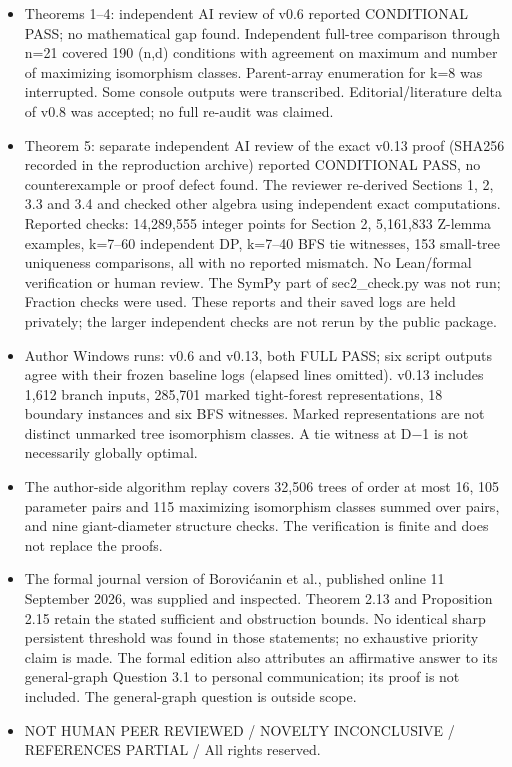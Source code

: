 \documentclass[
  10pt,
  a4paper,
]{article}
\providecommand{\tightlist}{%
  \setlength{\itemsep}{0pt}\setlength{\parskip}{0pt}}
\begin{document}
\begin{itemize}
\tightlist
\item
  Theorems 1--4: independent AI review of v0.6 reported CONDITIONAL
  PASS; no mathematical gap found. Independent full-tree comparison
  through n=21 covered 190 (n,d) conditions with agreement on maximum
  and number of maximizing isomorphism classes. Parent-array enumeration
  for k=8 was interrupted. Some console outputs were transcribed.
  Editorial/literature delta of v0.8 was accepted; no full re-audit was
  claimed.
\item
  Theorem 5: separate independent AI review of the exact v0.13 proof
  (SHA256 recorded in the reproduction archive) reported CONDITIONAL
  PASS, no counterexample or proof defect found. The reviewer re-derived
  Sections 1, 2, 3.3 and 3.4 and checked other algebra using independent
  exact computations. Reported checks: 14,289,555 integer points for
  Section 2, 5,161,833 Z-lemma examples, k=7--60 independent DP, k=7--40
  BFS tie witnesses, 153 small-tree uniqueness comparisons, all with no
  reported mismatch. No Lean/formal verification or human review. The
  SymPy part of sec2\_check.py was not run; Fraction checks were used.
  These reports and their saved logs are held privately; the larger
  independent checks are not rerun by the public package.
\item
  Author Windows runs: v0.6 and v0.13, both FULL PASS; six script
  outputs agree with their frozen baseline logs (elapsed lines omitted).
  v0.13 includes 1,612 branch inputs, 285,701 marked tight-forest
  representations, 18 boundary instances and six BFS witnesses. Marked
  representations are not distinct unmarked tree isomorphism classes. A
  tie witness at D−1 is not necessarily globally optimal.
\item
  The author-side algorithm replay covers 32,506 trees of order at most
  16, 105 parameter pairs and 115 maximizing isomorphism classes summed
  over pairs, and nine giant-diameter structure checks. The verification
  is finite and does not replace the proofs.
\item
  The formal journal version of Borovićanin et al., published online 11
  September 2026, was supplied and inspected. Theorem 2.13 and
  Proposition 2.15 retain the stated sufficient and obstruction bounds.
  No identical sharp persistent threshold was found in those statements;
  no exhaustive priority claim is made. The formal edition also
  attributes an affirmative answer to its general-graph Question 3.1 to
  personal communication; its proof is not included. The general-graph
  question is outside scope.
\item
  NOT HUMAN PEER REVIEWED / NOVELTY INCONCLUSIVE / REFERENCES PARTIAL /
  All rights reserved.
\end{itemize}
\end{document}
